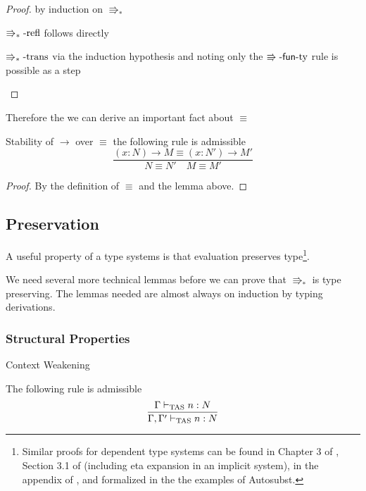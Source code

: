 \begin{proof}
by induction on $\Rrightarrow_{\ast}$
\begin{casenv}
  \item $\operatorname{\Rrightarrow_{\ast}-refl}$ follows directly
  \item $\operatorname{\Rrightarrow_{\ast}-trans}$ via the induction hypothesis and noting only the $\operatorname{\Rrightarrow-\mathsf{fun}-ty}$ rule is possible as a step
\end{casenv}
\end{proof}
Therefore the we can derive an important fact about $\equiv$
\begin{cor}
Stability of $\rightarrow$ over $\equiv$
the following rule is admissible
\[
\frac{\left(x:N\right)\rightarrow M\equiv\left(x:N'\right)\rightarrow M'}{N\equiv N'\quad M\equiv M'}
\]
\end{cor}

\begin{proof}
By the definition of $\equiv$ and the lemma above.
\end{proof}

\subsection{Preservation}

A useful property of a type systems is that evaluation preserves type\footnote{
   Similar proofs for dependent type systems can be found in Chapter 3 of \cite{luo1994computation}, Section 3.1 of \cite{10.1007/3-540-45413-6_27}(including eta expansion in an implicit system), in the appendix of \cite{sjoberg2012irrelevance}, and formalized in the the examples of Autosubst\cite{SchaeferEtAl:2015:Autosubst:-Reasoning}.
   }.

We need several more technical lemmas before we can prove that $\Rrightarrow_{\ast}$ is type preserving.
The lemmas needed are almost always on induction by typing derivations.

\subsubsection{Structural Properties}

\begin{thm}
Context Weakening

The following rule is admissible
\[
\frac{\Gamma\vdash_{\mathrm{TAS}} n:N}{\Gamma,\Gamma'\vdash_{\mathrm{TAS}} n:N}
\]
\end{thm}

